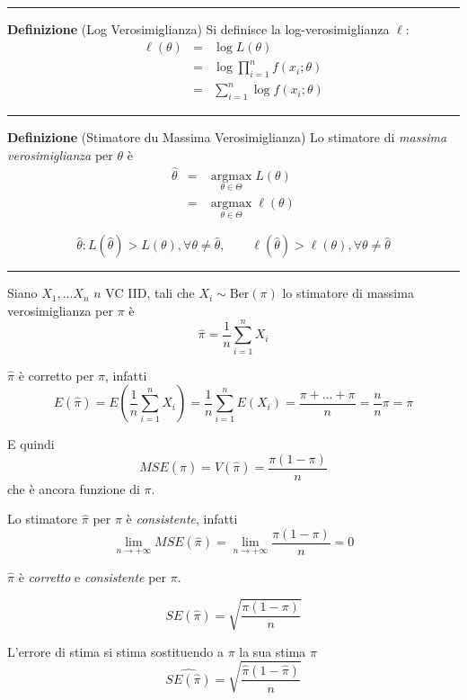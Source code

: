 \documentclass[
  11pt,
]{book}
\theoremstyle{mytheoremstyle}
\theoremstyle{mydefstyle}
\begin{document}
\begin{center}\rule{0.5\linewidth}{0.5pt}\end{center}

\textbf{Definizione} (Log Verosimiglianza)
Si definisce la log-verosimiglianza \(\ell\):
\begin{eqnarray*}
\ell(\theta) &=& \log L(\theta) \\
             &=& \log \prod_{i=1}^n f(x_i;\theta)\\
             &=& \sum_{i=1}^n \log f(x_i;\theta)
\end{eqnarray*}

\begin{center}\rule{0.5\linewidth}{0.5pt}\end{center}

\textbf{Definizione} (Stimatore du Massima Verosimiglianza)
Lo stimatore di \emph{massima verosimiglianza} per \(\theta\) è
\begin{eqnarray*}
\hat\theta &=& \operatorname*{\text{argmax}}_{\theta\in\Theta} L(\theta)\\
           &=& \operatorname*{\text{argmax}}_{\theta\in\Theta} \ell(\theta)
\end{eqnarray*}

\[\hat\theta:L(\hat\theta)>L(\theta), \forall\theta\neq\hat\theta, \qquad\ell(\hat\theta)>\ell(\theta), \forall\theta\neq\hat\theta\]

\begin{center}\rule{0.5\linewidth}{0.5pt}\end{center}

Siano \(X_1,...X_n\) \(n\) VC IID, tali che \(X_i\sim\text{Ber}(\pi)\) lo stimatore
di massima verosimiglianza per \(\pi\) è
\[\hat \pi=\frac 1n \sum_{i=1}^nX_i\]

\(\hat\pi\) è corretto per \(\pi\), infatti
\[E(\hat\pi)=E\left(\frac{1}n\sum_{i=1}^n X_i\right)=\frac{1}n\sum_{i=1}^nE(X_i)=\frac{\pi+...+\pi}{n}=\frac n n\pi=\pi\]

E quindi
\[MSE(\hat\pi)=V(\hat\pi)=\frac{\pi(1-\pi)}{n}\]
che è ancora funzione di \(\pi\).

Lo stimatore \(\hat\pi\) per \(\pi\) è \emph{consistente}, infatti
\[\lim_{n\to +\infty}MSE(\hat\pi)=\lim_{n\to +\infty}\frac{\pi(1-\pi)}{n}=0\]

\(\hat\pi\) è \emph{corretto} e \emph{consistente} per \(\pi\).

\[SE(\hat\pi)=\sqrt{\frac{\pi(1-\pi)}{n}}\]

L'errore di stima si stima sostituendo a \(\pi\) la sua stima \(\hat\pi\)
\[\widehat{SE(\hat\pi)}=\sqrt{\frac{\hat\pi(1-\hat\pi)}{n}}\]
\end{document}
